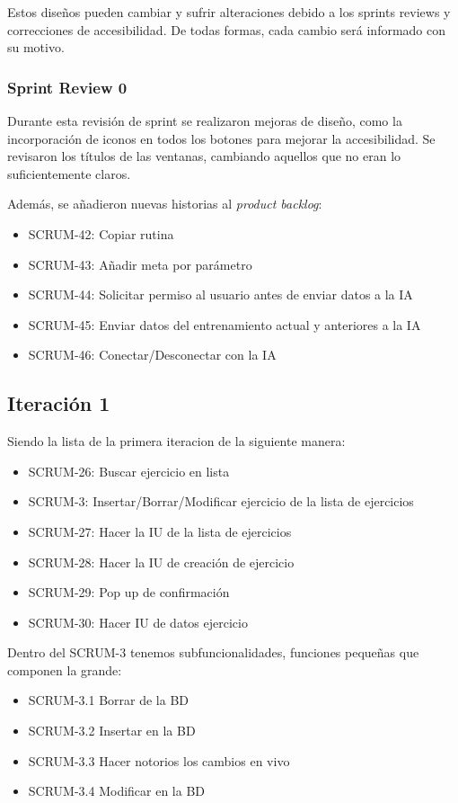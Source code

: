 Estos diseños pueden cambiar y sufrir alteraciones debido a los sprints reviews y correcciones de accesibilidad. De todas formas, cada cambio será informado con su motivo.

\subsubsection*{Sprint Review 0}
Durante esta revisi\'on de sprint se realizaron mejoras de dise\~no, como la incorporaci\'on de iconos en todos los botones para mejorar la accesibilidad. Se revisaron los t\'itulos de las ventanas, cambiando aquellos que no eran lo suficientemente claros.

Adem\'as, se a\~nadieron nuevas historias al \textit{product backlog}:

\begin{itemize}
  \item SCRUM-42: Copiar rutina
  \item SCRUM-43: Añadir meta por parámetro
  \item SCRUM-44: Solicitar permiso al usuario antes de enviar datos a la IA
  \item SCRUM-45: Enviar datos del entrenamiento actual y anteriores a la IA
  \item SCRUM-46: Conectar/Desconectar con la IA
\end{itemize}

\subsection*{Iteraci\'on 1}
Siendo la lista de la primera iteracion de la siguiente manera:

\begin{itemize}
    \item SCRUM-26: Buscar ejercicio en lista
    \item SCRUM-3: Insertar/Borrar/Modificar ejercicio de la lista de ejercicios
    \item SCRUM-27: Hacer la IU de la lista de ejercicios
    \item SCRUM-28: Hacer la IU de creación de ejercicio
    \item SCRUM-29: Pop up de confirmación
    \item SCRUM-30: Hacer IU de datos ejercicio
\end{itemize}

Dentro del SCRUM-3 tenemos subfuncionalidades, funciones pequeñas que componen la grande:

\begin{itemize}
	\item SCRUM-3.1 Borrar de la BD 
	\item SCRUM-3.2 Insertar en la BD
	\item SCRUM-3.3 Hacer notorios los cambios en vivo
	\item SCRUM-3.4 Modificar en la BD
\end{itemize}

